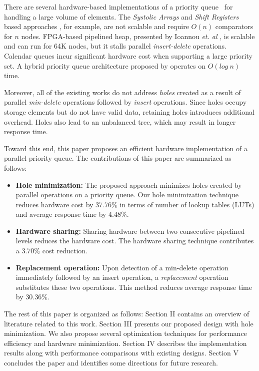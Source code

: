 \documentclass[10pt, conference, compsocconf]{IEEEtran}
\begin{document}
There are several hardware-based implementations of a priority queue~\cite{hw1,hw2,hw8,hw9,fpga1,fpga2,fpga3} for handling a large volume of elements.
The {\it Systolic Arrays} and {\it Shift Registers} based approaches \cite{hw8,hw9}, for example, are not scalable and require $O(n)$ comparators for $n$ nodes.
FPGA-based pipelined heap, presented by Ioannou {\it et. al} \cite{fpga1}, is scalable and can run for 64K nodes, but it stalls parallel {\it insert-delete} operations. Calendar queues \cite{hw1} incur significant hardware cost when supporting a large priority set. A hybrid priority queue architecture proposed by \cite{hwsw1} operates on $O(log \ n)$ time.

Moreover, all of the existing works do not address {\it holes} created as a result of parallel {\it min-delete} operations followed by {\it insert} operations.
Since holes occupy storage elements but do not have valid data, retaining holes introduces additional overhead.
Holes also lead to an unbalanced tree, which may result in longer response time.

Toward this end, this paper proposes an efficient hardware implementation of a parallel priority queue.
The contributions of this paper are summarized as follows:
\begin{itemize}
\item {\bf Hole minimization:} The proposed approach minimizes holes created by parallel operations on a priority queue. Our hole minimization technique reduces hardware cost by 37.76\% in terms of number of lookup tables (LUTs) and average response time by 4.48\%.
\item {\bf Hardware sharing:} Sharing hardware between two consecutive pipelined levels reduces the hardware cost. The hardware sharing technique contributes a 3.70\% cost reduction.
\item {\bf Replacement operation:} Upon detection of a min-delete operation immediately followed by an insert operation, a {\it replacement} operation substitutes these two operations. This method reduces average response time by 30.36\%.
\end{itemize}

The rest of this paper is organized as follows: Section II contains an overview of literature related to this work.
Section III presents our proposed design with hole minimization.
We also propose several optimization techniques for performance efficiency and hardware minimization.
Section IV describes the implementation results along with performance comparisons with existing designs.
Section V concludes the paper and identifies some directions for future research.
\end{document}

